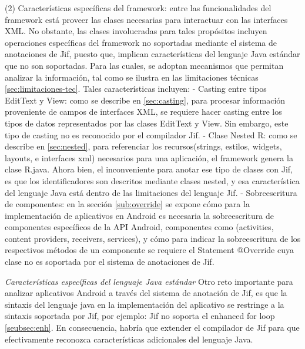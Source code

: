(2) Características específicas del framework: entre las funcionalidades del
framework está proveer las clases necesarias para interactuar con las interfaces
XML. No obstante, las clases involucradas para tales propósitos incluyen
operaciones específicas del framework no soportadas mediante el sistema de
anotaciones de Jif, puesto que, implican características del lenguaje Java
estándar que no son soportadas. Para las cuales, se adoptan mecanismos que
permitan analizar la información, tal como se ilustra en las limitaciones
técnicas \ref{sec:limitaciones-tec}. Tales características incluyen:\newline 
- Casting entre tipos EditText y View: como se describe en
\ref{sec:casting}, para procesar información proveniente de campos de interfaces XML, se requiere
hacer casting entre los tipos de datos representados por las clases EditText y
View. Sin embargo, este tipo de casting no es reconocido por el compilador
Jif.\newline 
- Clase Nested R: como se describe en \ref{sec:nested}, para referenciar los
recursos(strings, estilos, widgets, layouts, e interfaces xml) necesarios para
una aplicación, el framework genera la clase R.java. Ahora bien, el
inconveniente para anotar ese tipo de clases con Jif, es que los identificadores
son descritos mediante clases nested, y esa característica del lenguaje Java
está dentro de las limitaciones del lenguaje Jif.\newline 
- Sobreescritura de componentes: en la sección \ref{sub:override} se expone
cómo para la implementación de aplicativos en Android es necesaria la
sobreescritura de componentes específicos de la API Android, componentes como
(activities, content providers, receivers, services), y cómo para indicar la
sobreescritura de los respectivos métodos de un componente se requiere el
Statement @Override cuya clase no es soportada por el sistema de anotaciones de
Jif.\newline

\emph{Características específicas del lenguaje Java estándar}\newline
Otro reto importante para analizar aplicativos Android a través del sistema de
anotación de Jif, es que la sintaxis del lenguaje java en la implementación del
aplicativo se restringe a la sintaxis soportada por Jif, por ejemplo: Jif no
soporta el enhanced for loop \ref{seubsec:enh}. En consecuencia, habría que
extender el compilador de Jif para que efectivamente reconozca características
adicionales del lenguaje Java.

